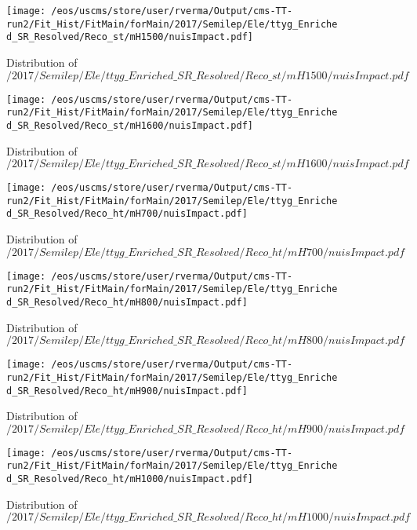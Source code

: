 \begin{figure}
\centering
\texttt{[image: /eos/uscms/store/user/rverma/Output/cms-TT-run2/Fit\_Hist/FitMain/forMain/2017/Semilep/Ele/ttyg\_Enriched\_SR\_Resolved/Reco\_st/mH1500/nuisImpact.pdf]}
\caption{Distribution of $/2017/Semilep/Ele/ttyg\_Enriched\_SR\_Resolved/Reco\_st/mH1500/nuisImpact.pdf$}
\end{figure}

\begin{figure}
\centering
\texttt{[image: /eos/uscms/store/user/rverma/Output/cms-TT-run2/Fit\_Hist/FitMain/forMain/2017/Semilep/Ele/ttyg\_Enriched\_SR\_Resolved/Reco\_st/mH1600/nuisImpact.pdf]}
\caption{Distribution of $/2017/Semilep/Ele/ttyg\_Enriched\_SR\_Resolved/Reco\_st/mH1600/nuisImpact.pdf$}
\end{figure}

\begin{figure}
\centering
\texttt{[image: /eos/uscms/store/user/rverma/Output/cms-TT-run2/Fit\_Hist/FitMain/forMain/2017/Semilep/Ele/ttyg\_Enriched\_SR\_Resolved/Reco\_ht/mH700/nuisImpact.pdf]}
\caption{Distribution of $/2017/Semilep/Ele/ttyg\_Enriched\_SR\_Resolved/Reco\_ht/mH700/nuisImpact.pdf$}
\end{figure}

\begin{figure}
\centering
\texttt{[image: /eos/uscms/store/user/rverma/Output/cms-TT-run2/Fit\_Hist/FitMain/forMain/2017/Semilep/Ele/ttyg\_Enriched\_SR\_Resolved/Reco\_ht/mH800/nuisImpact.pdf]}
\caption{Distribution of $/2017/Semilep/Ele/ttyg\_Enriched\_SR\_Resolved/Reco\_ht/mH800/nuisImpact.pdf$}
\end{figure}

\begin{figure}
\centering
\texttt{[image: /eos/uscms/store/user/rverma/Output/cms-TT-run2/Fit\_Hist/FitMain/forMain/2017/Semilep/Ele/ttyg\_Enriched\_SR\_Resolved/Reco\_ht/mH900/nuisImpact.pdf]}
\caption{Distribution of $/2017/Semilep/Ele/ttyg\_Enriched\_SR\_Resolved/Reco\_ht/mH900/nuisImpact.pdf$}
\end{figure}

\begin{figure}
\centering
\texttt{[image: /eos/uscms/store/user/rverma/Output/cms-TT-run2/Fit\_Hist/FitMain/forMain/2017/Semilep/Ele/ttyg\_Enriched\_SR\_Resolved/Reco\_ht/mH1000/nuisImpact.pdf]}
\caption{Distribution of $/2017/Semilep/Ele/ttyg\_Enriched\_SR\_Resolved/Reco\_ht/mH1000/nuisImpact.pdf$}
\end{figure}

